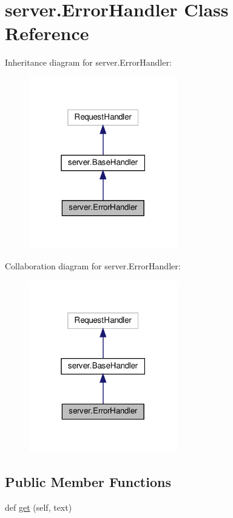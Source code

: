 \hypertarget{classserver_1_1ErrorHandler}{}\section{server.\+Error\+Handler Class Reference}
\label{classserver_1_1ErrorHandler}


Inheritance diagram for server.\+Error\+Handler\+:
\nopagebreak
\begin{figure}[H]
\begin{center}
\leavevmode
\includegraphics[width=183pt]{classserver_1_1ErrorHandler__inherit__graph}
\end{center}
\end{figure}


Collaboration diagram for server.\+Error\+Handler\+:
\nopagebreak
\begin{figure}[H]
\begin{center}
\leavevmode
\includegraphics[width=183pt]{classserver_1_1ErrorHandler__coll__graph}
\end{center}
\end{figure}
\subsection*{Public Member Functions}
\begin{DoxyCompactItemize}
\item 
def \hyperlink{classserver_1_1ErrorHandler_a38d1553803482dd9f6be576c66200f43}{get} (self, text)
\end{DoxyCompactItemize}
